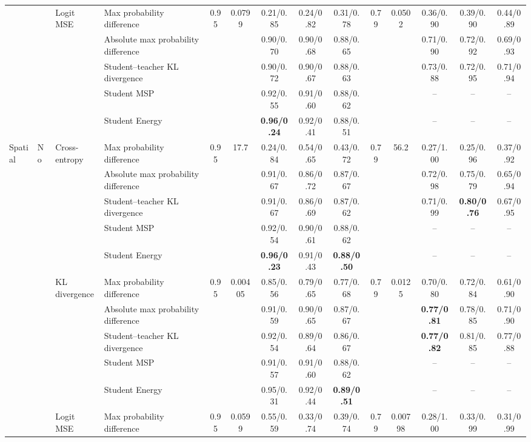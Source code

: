 \documentclass[border=2pt]{standalone}
\begin{document}
\begin{tabular}{llllcccccccccc}
 &  & Logit MSE & Max probability difference & 0.95 & 0.0799 & 0.21/0.85 & 0.24/0.82 & 0.31/0.78 & 0.79 & 0.0502 & 0.36/0.90 & 0.39/0.90 & 0.44/0.89 \\
 &  &  & Absolute max probability difference &  &  & 0.90/0.70 & 0.90/0.68 & 0.88/0.65 &  &  & 0.71/0.90 & 0.72/0.92 & 0.69/0.93 \\
 &  &  & Student--teacher KL divergence &  &  & 0.90/0.72 & 0.90/0.67 & 0.88/0.63 &  &  & 0.73/0.88 & 0.72/0.95 & 0.71/0.94 \\
 &  &  & Student MSP &  &  & 0.92/0.55 & 0.91/0.60 & 0.88/0.62 &  &  & -- & -- & -- \\
 &  &  & Student Energy &  &  & \textbf{0.96/0.24} & 0.92/0.41 & 0.88/0.51 &  &  & -- & -- & -- \\
\addlinespace
Spatial & No & Cross-entropy & Max probability difference & 0.95 & 17.7 & 0.24/0.84 & 0.54/0.65 & 0.43/0.72 & 0.79 & 56.2 & 0.27/1.00 & 0.25/0.96 & 0.37/0.92 \\
 &  &  & Absolute max probability difference &  &  & 0.91/0.67 & 0.86/0.72 & 0.87/0.67 &  &  & 0.72/0.98 & 0.75/0.79 & 0.65/0.94 \\
 &  &  & Student--teacher KL divergence &  &  & 0.91/0.67 & 0.86/0.69 & 0.87/0.62 &  &  & 0.71/0.99 & \textbf{0.80/0.76} & 0.67/0.95 \\
 &  &  & Student MSP &  &  & 0.92/0.54 & 0.90/0.61 & 0.88/0.62 &  &  & -- & -- & -- \\
 &  &  & Student Energy &  &  & \textbf{0.96/0.23} & 0.91/0.43 & \textbf{0.88/0.50} &  &  & -- & -- & -- \\
 &  & KL divergence & Max probability difference & 0.95 & 0.00405 & 0.85/0.56 & 0.79/0.65 & 0.77/0.68 & 0.79 & 0.0125 & 0.70/0.80 & 0.72/0.84 & 0.61/0.90 \\
 &  &  & Absolute max probability difference &  &  & 0.91/0.59 & 0.90/0.65 & 0.87/0.67 &  &  & \textbf{0.77/0.81} & 0.78/0.85 & 0.71/0.90 \\
 &  &  & Student--teacher KL divergence &  &  & 0.92/0.54 & 0.89/0.64 & 0.86/0.67 &  &  & \textbf{0.77/0.82} & 0.81/0.85 & 0.77/0.88 \\
 &  &  & Student MSP &  &  & 0.91/0.57 & 0.91/0.60 & 0.88/0.62 &  &  & -- & -- & -- \\
 &  &  & Student Energy &  &  & 0.95/0.31 & 0.92/0.44 & \textbf{0.89/0.51} &  &  & -- & -- & -- \\
 &  & Logit MSE & Max probability difference & 0.95 & 0.0599 & 0.55/0.59 & 0.33/0.74 & 0.39/0.74 & 0.79 & 0.00798 & 0.28/1.00 & 0.33/0.99 & 0.31/0.99 \\

\end{tabular}
\end{document}
